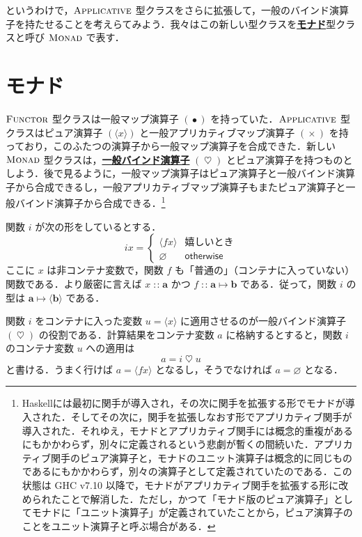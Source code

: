 \documentclass[a4paper,twocolumn]{jsbook}
\newcommand{\programminglanguage}[1]{\textsf{#1}}
\newcommand{\haskell}{\programminglanguage{Haskell}}
\newcommand{\keyword}[1]{{\underline{\textbf{#1}}}}
\newcommand{\mKeyword}[1]{\mathsf{#1}} %
\newcommand{\mOtherwiseKeyword}{\mKeyword{otherwise}}
\DeclareMathOperator{\mOtherwise}{\mOtherwiseKeyword}
\newcommand{\mPureNothing}{\varnothing}
\DeclareMathOperator{\mAppMap}{\times}
\DeclareMathOperator{\mBind}{\heartsuit}
\DeclareMathOperator{\mIn}{{:\!:}}
\DeclareMathOperator{\mMap}{\bullet}
\DeclareMathOperator{\mMapsTo}{\mapsto}
\newcommand{\mType}[1]{\mathbf{#1}}
\newcommand{\mPureType}[1]{\langle\mType{#1}\rangle}
\newcommand{\mPureWith}[1]{\langle#1\rangle}
\newcommand{\mGenericTypeClass}[1]{\textsc{#1}} %
\newcommand{\mApplicativeTypeClass}{\mGenericTypeClass{Applicative}}
\newcommand{\mFunctorTypeClass}{\mGenericTypeClass{Functor}}
\newcommand{\mMonadTypeClass}{\mGenericTypeClass{Monad}}
\newcommand{\mProj}[2]{#1\mMapsTo#2}
\begin{document}
というわけで，$\mApplicativeTypeClass$ 型クラスをさらに拡張して，一般のバインド演算子を持たせることを考えらてみよう．我々はこの新しい型クラスを\keyword{モナド}型クラスと呼び $\mMonadTypeClass$ で表す．

\section{モナド}

$\mFunctorTypeClass$ 型クラスは一般マップ演算子 $(\mMap)$ を持っていた．$\mApplicativeTypeClass$ 型クラスはピュア演算子 $(\mPureWith{x})$ と一般アプリカティブマップ演算子 $(\mAppMap)$ を持っており，このふたつの演算子から一般マップ演算子を合成できた．新しい $\mMonadTypeClass$ 型クラスは，\keyword{一般バインド演算子} $(\mBind)$ とピュア演算子を持つものとしよう．後で見るように，一般マップ演算子はピュア演算子と一般バインド演算子から合成できるし，一般アプリカティブマップ演算子もまたピュア演算子と一般バインド演算子から合成できる．\footnote{\haskell には最初に関手が導入され，その次に関手を拡張する形でモナドが導入された．そしてその次に，関手を拡張しなおす形でアプリカティブ関手が導入された．それゆえ，モナドとアプリカティブ関手には概念的重複があるにもかかわらず，別々に定義されるという悲劇が暫くの間続いた．アプリカティブ関手のピュア演算子と，モナドのユニット演算子は概念的に同じものであるにもかかわらず，別々の演算子として定義されていたのである．この状態は GHC v7.10 以降で，モナドがアプリカティブ関手を拡張する形に改められたことで解消した．ただし，かつて「モナド版のピュア演算子」としてモナドに「ユニット演算子」が定義されていたことから，ピュア演算子のことをユニット演算子と呼ぶ場合がある．}

関数 $i$ が次の形をしているとする．
\begin{equation}
\label{eq:def-of-i}
ix=\begin{cases}
\mPureWith{fx}&\text{嬉しいとき}\\
\mPureNothing&\mOtherwise
\end{cases}
\end{equation}
ここに $x$ は非コンテナ変数で，関数 $f$ も「普通の」（コンテナに入っていない）関数である．より厳密に言えば $x\mIn\mType{a}$ かつ $f\mIn\mProj{\mType{a}}{\mType{b}}$ である．従って，関数 $i$ の型は $\mProj{\mType{a}}{\mPureType{b}}$ である．

関数 $i$ をコンテナに入った変数 $u=\mPureWith{x}$ に適用させるのが一般バインド演算子 $(\mBind)$ の役割である．計算結果をコンテナ変数 $a$ に格納するとすると，関数 $i$ のコンテナ変数 $u$ への適用は
\begin{equation}
\label{eq:i-love-u}
a=i\mBind u
\end{equation}
と書ける．うまく行けば $a=\mPureWith{fx}$ となるし，そうでなければ $a=\mPureNothing$ となる．
\end{document}
